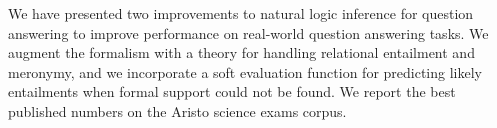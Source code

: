 We have presented two improvements to natural logic inference for question answering
  to improve performance on real-world question answering tasks.
We augment the formalism with a theory for handling relational entailment and meronymy,
  and we incorporate a soft evaluation function for predicting likely entailments when
  formal support could not be found.
We report the best published numbers on the Aristo science exams corpus.

